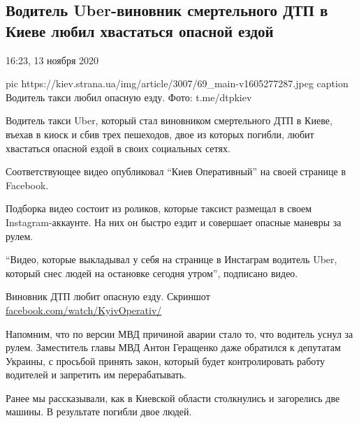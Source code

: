  
 

 

\subsection{Водитель Uber-виновник смертельного ДТП в Киеве любил хвастаться опасной ездой}
\label{sec:13_11_2020.news.ua.strana.1.uber_voditel_opasnaja_jezda}

16:23, 13 ноября 2020

\ifcmt
pic https://kiev.strana.ua/img/article/3007/69_main-v1605277287.jpeg
caption Водитель такси любил опасную езду. Фото: t.me/dtpkiev
\fi

Водитель такси Uber, который стал виновником смертельного ДТП в Киеве,
въехав в киоск и сбив трех пешеходов, двое из которых погибли, любит
хвастаться опасной ездой в своих социальных сетях.

Соответствующее видео опубликовал \enquote{Киев Оперативный} на своей странице в
Facebook.

Подборка видео состоит из роликов, которые таксист размещал в
своем Instagram-аккаунте. На них он быстро ездит и совершает опасные
маневры за рулем.

\enquote{Видео, которые выкладывал у себя на странице в Инстаграм водитель Uber,
который снес людей на остановке сегодня утром}, \dshM подписано видео.

Виновник ДТП любит опасную езду. Скриншот \url{facebook.com/watch/KyivOperativ/}

Напомним, что по версии МВД причиной аварии стало то, что водитель уснул
за рулем. Заместитель главы МВД Антон Геращенко даже обратился к депутатам
Украины, с просьбой принять закон, который будет контролировать работу
водителей и запретить им перерабатывать. 

Ранее мы рассказывали, как в Киевской области столкнулись и загорелись две
машины. В результате погибли двое людей.

